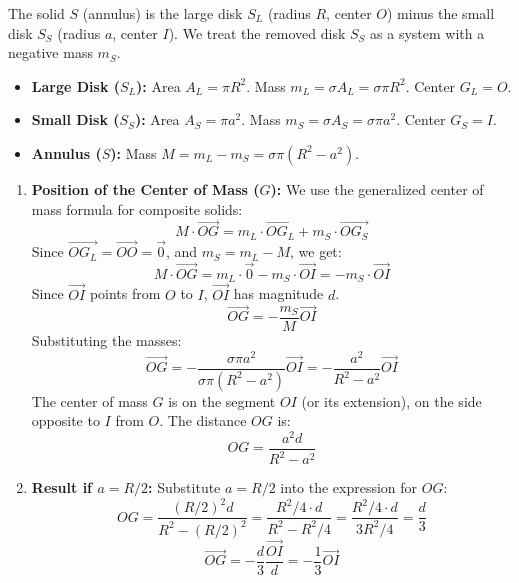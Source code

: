\documentclass[12pt]{article}
\begin{document}
\begin{correctionbox}
The solid $S$ (annulus) is the large disk $S_L$ (radius $R$, center $O$) minus the small disk $S_S$ (radius $a$, center $I$). We treat the removed disk $S_S$ as a system with a negative mass $m_S$.

\begin{itemize}
    \item \textbf{Large Disk ($S_L$):} Area $A_L = \pi R^2$. Mass $m_L = \sigma A_L = \sigma \pi R^2$. Center $G_L=O$.
    \item \textbf{Small Disk ($S_S$):} Area $A_S = \pi a^2$. Mass $m_S = \sigma A_S = \sigma \pi a^2$. Center $G_S=I$.
    \item \textbf{Annulus ($S$):} Mass $M = m_L - m_S = \sigma \pi (R^2 - a^2)$.
\end{itemize}

\begin{enumerate}
    \item \textbf{Position of the Center of Mass ($G$):}
        We use the generalized center of mass formula for composite solids:
        $$M \cdot \vec{OG} = m_L \cdot \vec{OG_L} + m_S \cdot \vec{OG_S}$$
        Since $\vec{OG_L} = \vec{OO} = \vec{0}$, and $m_S = m_L - M$, we get:
        $$M \cdot \vec{OG} = m_L \cdot \vec{0} - m_S \cdot \vec{OI} = - m_S \cdot \vec{OI}$$
        Since $\vec{OI}$ points from $O$ to $I$, $\vec{OI}$ has magnitude $d$.
        $$\vec{OG} = -\frac{m_S}{M} \vec{OI}$$
        Substituting the masses:
        $$\vec{OG} = -\frac{\sigma \pi a^2}{\sigma \pi (R^2-a^2)} \vec{OI} = -\frac{a^2}{R^2-a^2} \vec{OI}$$
        The center of mass $G$ is on the segment $OI$ (or its extension), on the side opposite to $I$ from $O$. The distance $OG$ is:
        $$OG = \frac{a^2 d}{R^2-a^2}$$

    \item \textbf{Result if $a = R/2$:}
        Substitute $a=R/2$ into the expression for $OG$:
        $$OG = \frac{(R/2)^2 d}{R^2 - (R/2)^2} = \frac{R^2/4 \cdot d}{R^2 - R^2/4} = \frac{R^2/4 \cdot d}{3R^2/4} = \frac{d}{3}$$
        $$\vec{OG} = -\frac{d}{3}\frac{\vec{OI}}{d} = -\frac{1}{3} \vec{OI}$$


\end{enumerate}
\end{correctionbox}
\end{document}
